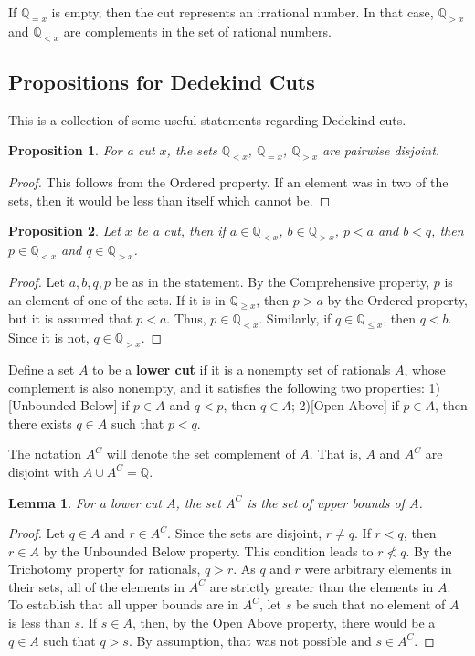 \documentclass[12pt]{article}
\newtheorem{lemma}{Lemma}[section]
\newtheorem{proposition}{Proposition}[section]
\newcommand{\qcut}[2][x]{\ensuremath{\mathbb{Q}_{#2 #1}}}
\newcommand{\qlt}[1][x]{\qcut[#1]{<}}
\newcommand{\qeq}[1][x]{\qcut[#1]{=}}
\newcommand{\qgt}[1][x]{\qcut[#1]{>}}
\newcommand{\qgeq}[1][x]{\qcut[#1]{\geq}}
\newcommand{\qleq}[1][x]{\qcut[#1]{\leq}}
\begin{document}
If $\qeq$ is empty, then the cut represents an irrational number. In that case, $\qgt$ and $\qlt$ are complements in the set of rational numbers. 


\subsection{Propositions for Dedekind Cuts}

This is a collection of some useful statements regarding Dedekind cuts. 

\begin{proposition}
    For a cut $x$, the sets $\qlt$, $\qeq$, $\qgt$ are pairwise disjoint. 
\end{proposition}

\begin{proof}
    This follows from the Ordered property. If an element was in two of the sets, then it would be less than itself which cannot be. 
\end{proof}

\begin{proposition}\label{br:cut-unbounded}
    Let $x$ be a cut, then if $a \in \qlt$, $b \in \qgt$, $p < a$ and $b < q$, then $p \in \qlt$ and $q \in \qgt$.
\end{proposition}

\begin{proof}
    Let $a,b, q, p$ be as in the statement. By the Comprehensive property, $p$ is an element of one of the sets. If it is in $\qgeq$, then $p > a$ by the Ordered property, but it is assumed that $p < a$. Thus, $p \in \qlt$. Similarly, if $q \in \qleq$, then $q < b$. Since it is not, $q \in \qgt$. 
\end{proof}

Define a set $A$ to be a \textbf{lower cut} if it is a nonempty set of rationals $A$, whose complement is also nonempty, and it satisfies the following two properties: 1) [Unbounded Below] if $p \in A$ and $q < p$, then $q \in A$; 2)[Open Above] if $p \in A$, then there exists $q \in A$ such that $p < q$.

The notation $A^C$ will denote the set complement of $A$. That is, $A$ and $A^C$ are disjoint with $A \cup A^C = \mathbb{Q}$.

\begin{lemma}
    For a lower cut $A$, the set $A^C$ is the set of upper bounds of $A$.
\end{lemma}

\begin{proof}
    Let $q \in A$ and $r \in A^C$. Since the sets are disjoint, $r \neq q$. If $r < q$, then $r \in A$ by the Unbounded Below property. This condition leads to $r \nless q$. By the Trichotomy property for rationals, $q > r$. As $q$ and $r$ were arbitrary elements in their sets, all of the elements in $A^C$ are strictly greater than the elements in $A$. To establish that all upper bounds are in $A^C$, let $s$ be such that no element of $A$ is less than $s$. If $s \in A$, then, by the Open Above property, there would be a $q \in A$ such that $q > s$. By assumption, that was not possible and $s \in A^C$. 
\end{proof}
\end{document}
